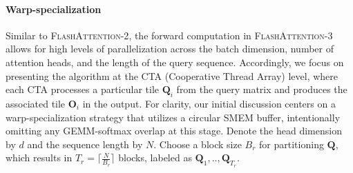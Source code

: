 \paragraph{Warp-specialization}
Similar to \textsc{FlashAttention-2}, the forward computation in \textsc{FlashAttention-3} allows for high levels of parallelization across the batch dimension, number of attention heads, and the length of the query sequence. Accordingly, we focus on presenting the algorithm at the CTA (Cooperative Thread Array) level, where each CTA processes a particular tile $\mathbf{Q}_i$ from the query matrix and produces the associated tile $\mathbf{O}_i$ in the output. For clarity, our initial discussion centers on a warp-specialization strategy that utilizes a circular SMEM buffer, intentionally omitting any GEMM-softmax overlap at this stage. Denote the head dimension by $d$ and the sequence length by $N$. Choose a block size $B_r$ for partitioning $\mathbf{Q}$, which results in $T_r = \lceil \frac{N}{B_r} \rceil$ blocks, labeled as $\mathbf{Q}_1, .., \mathbf{Q}_{T_r}$.

